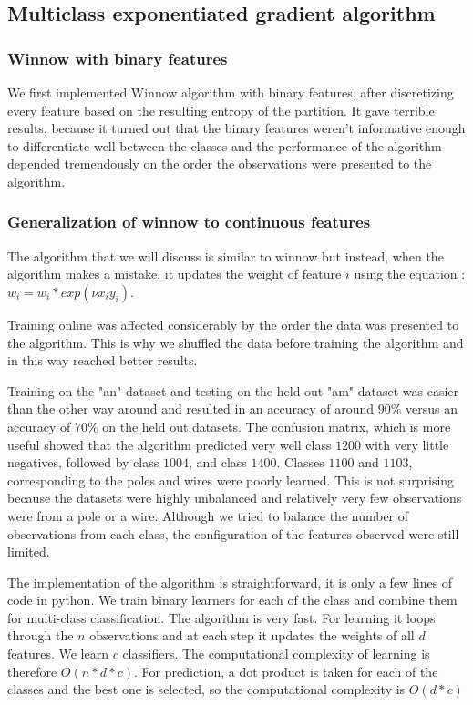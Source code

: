 \documentclass[10pt,a4paper]{article}
\begin{document}
\subsection{Multiclass exponentiated gradient algorithm}

\subsubsection{Winnow with binary features}
We first implemented Winnow algorithm with binary features, after discretizing every feature based on the resulting entropy of the partition. It gave terrible results, because it turned out that the binary features weren't informative enough to differentiate well between the classes and the performance of the algorithm depended tremendously on the order the observations were presented to the algorithm. 

\subsubsection{Generalization of winnow to continuous features}

The algorithm that we will discuss is similar to winnow but instead, when the algorithm makes a mistake, it updates the weight of feature $i$ using the equation : $w_i = w_i*exp(\nu x_i y_i)$. 

Training online was affected considerably by the order the data was presented to the algorithm. This is why we shuffled the data before training the algorithm and in this way reached better results.

Training on the "an" dataset and testing on the held out "am" dataset was easier than the other way around and resulted in an accuracy of around $90\%$ versus an accuracy of $70\%$ on the held out datasets. The confusion matrix, which is more useful showed that the algorithm predicted very well class $1200$ with very little negatives, followed by class $1004$, and class $1400$. Classes $1100$ and $1103$, corresponding to the poles and wires were poorly learned. This is not surprising because the datasets were highly unbalanced and relatively very few observations were from a pole or a wire. Although we tried to balance the number of observations from each class, the configuration of the features observed were still limited.

The implementation of the algorithm is straightforward, it is only a few lines of code in python. We train binary learners for each of the class and combine them for multi-class classification. The algorithm is very fast. For learning it loops through the $n$ observations and at each step it updates the weights of all $d$ features. We learn $c$ classifiers. The computational complexity of learning is therefore $O(n*d*c)$. For prediction, a dot product is taken for each of the classes and the best one is selected, so the computational complexity is $O(d*c)$
\end{document}
